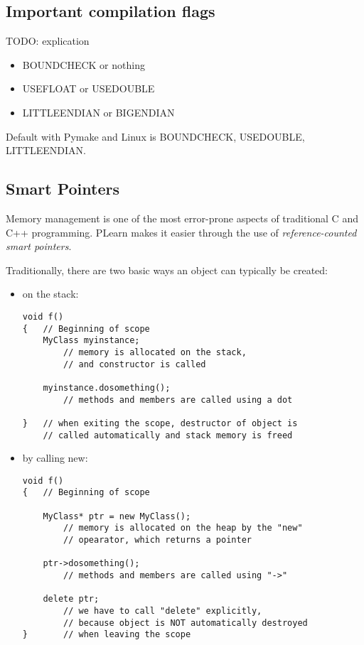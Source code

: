 \documentclass[11pt]{book}
\begin{document}
\subsection{Important compilation flags}
TODO: explication

\begin{itemize}
\item BOUNDCHECK or nothing
\item USEFLOAT or USEDOUBLE
\item LITTLEENDIAN or BIGENDIAN
\end{itemize}
 Default with Pymake and Linux is BOUNDCHECK, USEDOUBLE, \linebreak
LITTLEENDIAN.

\subsection{Smart Pointers}
\label{PP}
 Memory management is one of the most error-prone aspects of traditional
C and C++ programming. PLearn makes it easier through the use of
\emph{reference-counted smart pointers}.

 Traditionally, there are two basic ways an object can typically be created: 

\begin{itemize}
\item  on the stack:
\begin{verbatim}
void f()
{   // Beginning of scope
    MyClass myinstance; 
        // memory is allocated on the stack,
        // and constructor is called

    myinstance.dosomething();
        // methods and members are called using a dot

}   // when exiting the scope, destructor of object is
    // called automatically and stack memory is freed
\end{verbatim}

\item  by calling new:
\begin{verbatim}
void f()
{   // Beginning of scope

    MyClass* ptr = new MyClass(); 
        // memory is allocated on the heap by the "new"
        // opearator, which returns a pointer

    ptr->dosomething(); 
        // methods and members are called using "->"

    delete ptr;
        // we have to call "delete" explicitly,
        // because object is NOT automatically destroyed
}       // when leaving the scope
\end{verbatim}

\end{itemize}
\end{document}
